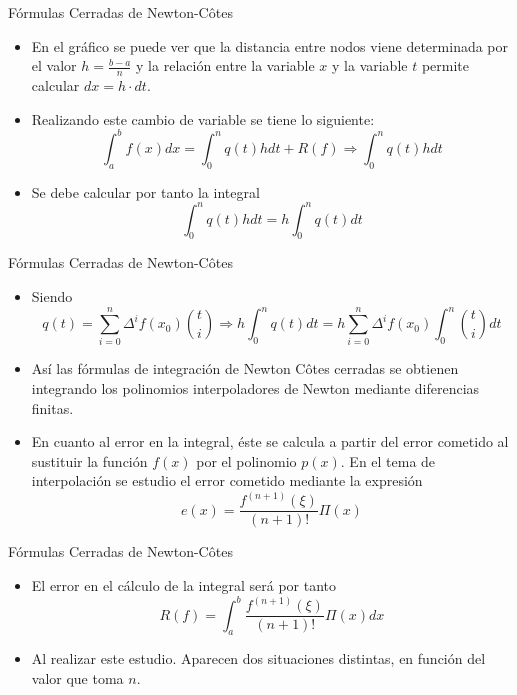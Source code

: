 \documentclass[12pt]{beamer}
\begin{document}
\begin{frame}{F\'ormulas Cerradas de Newton-C\^otes}
  \begin{itemize}
    \item En el gráfico se puede ver que la distancia entre nodos viene determinada por el valor $h=\frac{b-a}{n}$ y la
    relación entre la variable $x$ y la variable $t$ permite calcular $dx = h\cdot dt$.
    \item<2-> Realizando este cambio de variable se tiene lo siguiente:
    $$
    \int_a^bf(x)dx = \int_0^nq(t)hdt+R(f) \Rightarrow \int_0^nq(t)hdt 
    $$
    \item<3-> Se debe calcular por tanto la integral
    $$
    \int_0^nq(t)hdt = h\int_{0}^{n}q(t)dt
    $$
  \end{itemize}
\end{frame}
\begin{frame}{F\'ormulas Cerradas de Newton-C\^otes}
  \begin{itemize}
    \item Siendo
    \small{
    $$
    q(t) = \sum_{i=0}^{n}\Delta^if(x_0)\binom{t}{i}\Rightarrow h\int_{0}^{n}q(t)dt = h\sum_{i=0}^{n}\Delta^if(x_0)\int_{0}^{n}\binom{t}{i}dt    
    $$}
    \item<2-> Así las fórmulas de integración de Newton C\^otes cerradas se obtienen integrando los polinomios interpoladores de Newton mediante diferencias finitas.
    \item<3-> En cuanto al error en la integral, éste se calcula a partir del error cometido al sustituir la función $f (x)$ por el polinomio $p(x)$. En el tema de interpolación se estudio el error cometido mediante la expresión
    $$
    e(x) = \dfrac{f^{(n+1)}(\xi)}{(n+1)!}\Pi(x)
    $$
  \end{itemize}
\end{frame}
\begin{frame}{F\'ormulas Cerradas de Newton-C\^otes}
  \begin{itemize}
    \item El error en el cálculo de la integral será por tanto
    $$
    R(f) = \int_{a}^{b}\dfrac{f^{(n+1)}(\xi)}{(n+1)!}\Pi(x)dx
    $$
    \item<2-> Al realizar este estudio. Aparecen dos situaciones distintas, en función del valor que toma $n$.
  \end{itemize}
\end{frame}
\end{document}
